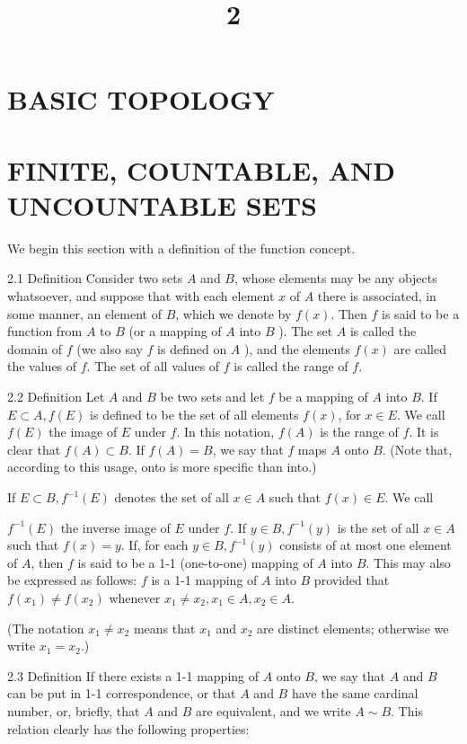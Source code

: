 \documentclass[10pt]{article}
\title{2 }
\author{}
\date{}
\begin{document}
\maketitle
\section{BASIC TOPOLOGY}
\section{FINITE, COUNTABLE, AND UNCOUNTABLE SETS}
We begin this section with a definition of the function concept.

2.1 Definition Consider two sets $A$ and $B$, whose elements may be any objects whatsoever, and suppose that with each element $x$ of $A$ there is associated, in some manner, an element of $B$, which we denote by $f(x)$. Then $f$ is said to be a function from $A$ to $B$ (or a mapping of $A$ into $B$ ). The set $A$ is called the domain of $f$ (we also say $f$ is defined on $A$ ), and the elements $f(x)$ are called the values of $f$. The set of all values of $f$ is called the range of $f$.

2.2 Definition Let $A$ and $B$ be two sets and let $f$ be a mapping of $A$ into $B$. If $E \subset A, f(E)$ is defined to be the set of all elements $f(x)$, for $x \in E$. We call $f(E)$ the image of $E$ under $f$. In this notation, $f(A)$ is the range of $f$. It is clear that $f(A) \subset B$. If $f(A)=B$, we say that $f$ maps $A$ onto $B$. (Note that, according to this usage, onto is more specific than into.)

If $E \subset B, f^{-1}(E)$ denotes the set of all $x \in A$ such that $f(x) \in E$. We call

$f^{-1}(E)$ the inverse image of $E$ under $f$. If $y \in B, f^{-1}(y)$ is the set of all $x \in A$
such that $f(x)=y$. If, for each $y \in B, f^{-1}(y)$ consists of at most one element of $A$, then $f$ is said to be a 1-1 (one-to-one) mapping of $A$ into $B$. This may also be expressed as follows: $f$ is a 1-1 mapping of $A$ into $B$ provided that $f\left(x_{1}\right) \neq f\left(x_{2}\right)$ whenever $x_{1} \neq x_{2}, x_{1} \in A, x_{2} \in A$.

(The notation $x_{1} \neq x_{2}$ means that $x_{1}$ and $x_{2}$ are distinct elements; otherwise we write $x_{1}=x_{2}$.)

2.3 Definition If there exists a 1-1 mapping of $A$ onto $B$, we say that $A$ and $B$ can be put in 1-1 correspondence, or that $A$ and $B$ have the same cardinal number, or, briefly, that $A$ and $B$ are equivalent, and we write $A \sim B$. This relation clearly has the following properties:
\end{document}
